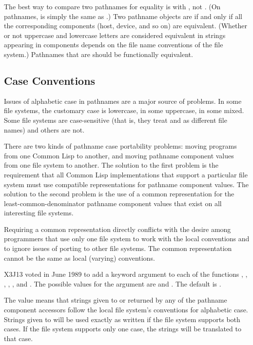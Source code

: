 The best way to compare two pathnames for equality is with ,
not .
(On pathnames,  is simply the same as .)
Two pathname objects are  if and only if
all the corresponding components
(host, device, and so on) are equivalent.  (Whether or not
uppercase and lowercase letters are considered equivalent
in strings appearing in components depends on the file
name conventions of the file system.)  Pathnames
that are  should be functionally equivalent.

\subsection{Case Conventions}
\label{PATHNAME-COMPONENT-CASE-SECTION}

  Issues of alphabetic case in pathnames are a major source of problems.
  In some file systems, the customary case is lowercase, in some uppercase,
  in some mixed.  Some file systems are case-sensitive (that is, they treat
   and  as different file names) and others are not.

  There are two kinds of pathname case portability problems: moving
  programs from one Common Lisp to another, and moving pathname component
  values from one file system to another.  The solution to the first problem
  is the requirement that all
  Common Lisp implementations that support a particular file system must
  use compatible representations for pathname component values.  The solution to
  the second problem is the use of a common representation for the
  least-common-denominator pathname component values that exist on all
  interesting file systems.

  Requiring a common representation directly conflicts with the
  desire among programmers that use only one file system to work with the
  local conventions and to ignore issues of porting to other file
  systems.  The common representation cannot be the same as local (varying)
  conventions.

X3J13 voted in June 1989  to
add a keyword argument  to each of the functions
  , ,
  , , ,
  and .
  The possible values for the argument are  and .
  The default is .

  The value  means that strings given to 
  or returned by any of the pathname component accessors
  follow the local file system's conventions for alphabetic case.
  Strings given to  will be used exactly as written if
  the file system supports both cases.  If the file system
  supports only one case, the strings will be translated to that case.


